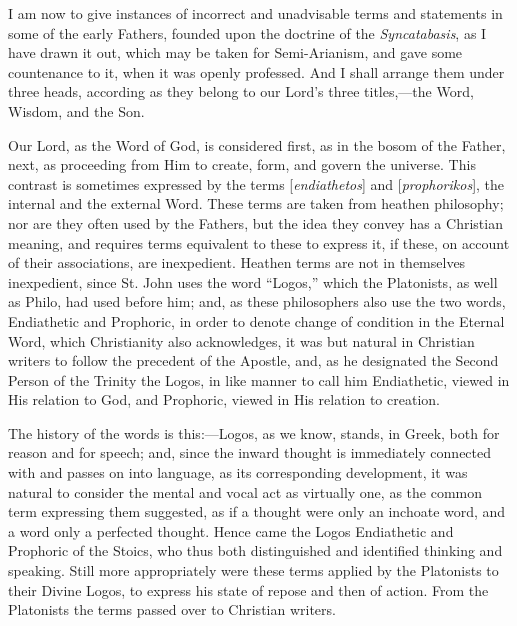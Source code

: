 
I am now to give instances of incorrect and unadvisable terms
and statements in some of the early Fathers, founded upon the doctrine
of the \emph{Syncatabasis}, as I have drawn it out, which may be taken
for Semi-Arianism, and gave some countenance to it, when it was openly
professed. And I shall arrange them under three heads, according as
they belong to our Lord's three titles,—the Word, Wisdom, and the
Son.


Our Lord, as the Word of God, is considered first, as in the bosom
of the Father, next, as proceeding from Him to create, form, and
govern the universe. This contrast is sometimes expressed by the terms
[\emph{endiathetos}] and [\emph{prophorikos}], the internal and the
external Word. These terms are taken from heathen philosophy; nor are
they often used by the Fathers, but the idea they convey has a
Christian meaning, and requires terms equivalent to these to express
it, if these, on account of their associations, are inexpedient.
Heathen terms are not in themselves inexpedient, since St. John uses
the word ``Logos,'' which the Platonists, as well as Philo,
had used before him; and, as these philosophers also use the two
words, Endiathetic and Prophoric, in order to denote change of
condition in the Eternal Word, which Christianity also acknowledges,
it was but natural in Christian writers to follow the precedent of the
Apostle, and, as he designated the Second Person of the Trinity the
Logos, in like manner to call him Endiathetic, viewed in His
relation to God, and Prophoric, viewed in His relation to creation.

The history of the words is this:—Logos, as we know, stands, in
Greek, both for reason and for speech; and, since the inward thought
is immediately connected with and passes on into language, as its
corresponding development, it was natural to consider the mental and
vocal act as virtually one, as the common term expressing them
suggested, as if a thought were only an inchoate word, and a word only
a perfected thought. Hence came the Logos Endiathetic and Prophoric of
the Stoics, who thus both distinguished and identified thinking and
speaking. Still more appropriately were these terms applied by the
Platonists to their Divine Logos, to express his state of repose and
then of action. From the Platonists the terms passed over to Christian
writers.

